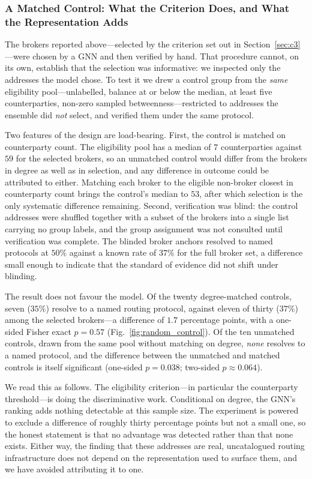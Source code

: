 \documentclass[final,5p,times]{elsarticle}
\begin{document}
\subsubsection{A Matched Control: What the Criterion Does, and What the
Representation Adds}
\label{sec:control}
The brokers reported above---selected by the criterion set out in
Section~\ref{sec:c3}---were chosen by a GNN and then verified by hand.
That procedure cannot, on its own, establish that the selection was
informative: we inspected only the addresses the model chose. To test it we
drew a control group from the \emph{same} eligibility pool---unlabelled,
balance at or below the median, at least five counterparties, non-zero
sampled betweenness---restricted to addresses the ensemble did \emph{not}
select, and verified them under the same protocol.

Two features of the design are load-bearing. First, the control is matched
on counterparty count. The eligibility pool has a median of $7$ counterparties
against $59$ for the selected brokers, so an unmatched control would differ
from the brokers in degree as well as in selection, and any difference in
outcome could be attributed to either. Matching each broker to the eligible
non-broker closest in counterparty count brings the control's median to $53$,
after which selection is the only systematic difference remaining. Second,
verification was blind: the control addresses were shuffled together with a
subset of the brokers into a single list carrying no group labels, and the
group assignment was not consulted until verification was complete. The
blinded broker anchors resolved to named protocols at $50\%$ against a known
rate of $37\%$ for the full broker set, a difference small enough to indicate
that the standard of evidence did not shift under blinding.

The result does not favour the model. Of the twenty degree-matched controls,
seven ($35\%$) resolve to a named routing protocol, against eleven of thirty
($37\%$) among the selected brokers---a difference of $1.7$ percentage points,
with a one-sided Fisher exact $p = 0.57$ (Fig.~\ref{fig:random_control}).
Of the ten unmatched controls, drawn from the same pool without matching on
degree, \emph{none} resolves to a named protocol, and the difference between
the unmatched and matched controls is itself significant (one-sided $p = 0.038$; two-sided $p \approx 0.064$).

We read this as follows. The eligibility criterion---in particular the
counterparty threshold---is doing the discriminative work. Conditional on
degree, the GNN's ranking adds nothing detectable at this sample size. The
experiment is powered to exclude a difference of roughly thirty percentage
points but not a small one, so the honest statement is that no advantage was
detected rather than that none exists. Either way, the finding that these
addresses are real, uncatalogued routing infrastructure does not depend on
the representation used to surface them, and we have avoided attributing it
to one.
\end{document}
